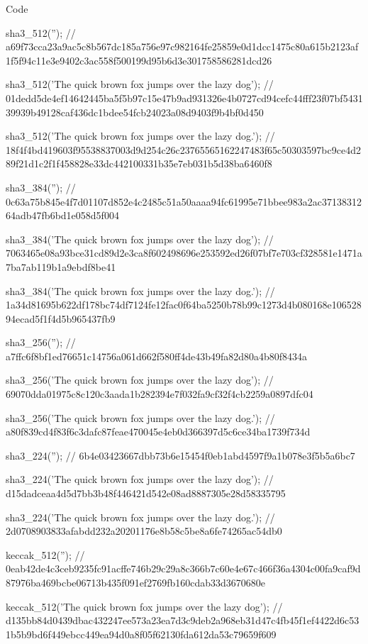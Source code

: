 Code 
\begin{DoxyCode}
sha3\_512('');
//
       a69f73cca23a9ac5c8b567dc185a756e97c982164fe25859e0d1dcc1475c80a615b2123af1f5f94c11e3e9402c3ac558f500199d95b6d3e301758586281dcd26

sha3\_512('The quick brown fox jumps over the lazy dog');
//
       01dedd5de4ef14642445ba5f5b97c15e47b9ad931326e4b0727cd94cefc44fff23f07bf543139939b49128caf436dc1bdee54fcb24023a08d9403f9b4bf0d450

sha3\_512('The quick brown fox jumps over the lazy dog.');
//
       18f4f4bd419603f95538837003d9d254c26c23765565162247483f65c50303597bc9ce4d289f21d1c2f1f458828e33dc442100331b35e7eb031b5d38ba6460f8

sha3\_384('');
// 0c63a75b845e4f7d01107d852e4c2485c51a50aaaa94fc61995e71bbee983a2ac3713831264adb47fb6bd1e058d5f004

sha3\_384('The quick brown fox jumps over the lazy dog');
// 7063465e08a93bce31cd89d2e3ca8f602498696e253592ed26f07bf7e703cf328581e1471a7ba7ab119b1a9ebdf8be41

sha3\_384('The quick brown fox jumps over the lazy dog.');
// 1a34d81695b622df178bc74df7124fe12fac0f64ba5250b78b99c1273d4b080168e10652894ecad5f1f4d5b965437fb9

sha3\_256('');
// a7ffc6f8bf1ed76651c14756a061d662f580ff4de43b49fa82d80a4b80f8434a

sha3\_256('The quick brown fox jumps over the lazy dog');
// 69070dda01975c8c120c3aada1b282394e7f032fa9cf32f4cb2259a0897dfc04

sha3\_256('The quick brown fox jumps over the lazy dog.');
// a80f839cd4f83f6c3dafc87feae470045e4eb0d366397d5c6ce34ba1739f734d

sha3\_224('');
// 6b4e03423667dbb73b6e15454f0eb1abd4597f9a1b078e3f5b5a6bc7

sha3\_224('The quick brown fox jumps over the lazy dog');
// d15dadceaa4d5d7bb3b48f446421d542e08ad8887305e28d58335795

sha3\_224('The quick brown fox jumps over the lazy dog.');
// 2d0708903833afabdd232a20201176e8b58c5be8a6fe74265ac54db0

keccak\_512('');
//
       0eab42de4c3ceb9235fc91acffe746b29c29a8c366b7c60e4e67c466f36a4304c00fa9caf9d87976ba469bcbe06713b435f091ef2769fb160cdab33d3670680e

keccak\_512('The quick brown fox jumps over the lazy dog');
//
       d135bb84d0439dbac432247ee573a23ea7d3c9deb2a968eb31d47c4fb45f1ef4422d6c531b5b9bd6f449ebcc449ea94d0a8f05f62130fda612da53c79659f609


\end{DoxyCode}
